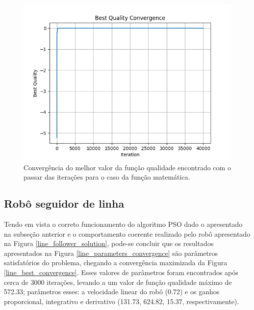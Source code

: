 \documentclass[conference]{IEEEtran}
\begin{document}
\begin{figure}[htbp]
\centering
\centerline{\includegraphics[scale=0.4]{test_best_convergence.png}}
\caption{Convergência do melhor valor da função qualidade encontrado com o passar das iterações para o caso da função matemática.}
\label{test_best_convergence}
\end{figure}

\subsection{Robô seguidor de linha}

Tendo em vista o correto funcionamento do algoritmo PSO dado o apresentado na subseção anterior e o comportamento coerente realizado pelo robô apresentado na Figura \ref{line_follower_solution}, pode-se concluir que os resultados apresentados na Figura \ref{line_parameters_convergence} são parâmetros satisfatórios do problema, chegando a convergência maximizada da Figura \ref{line_best_convergence}. Esses valores de parâmetros foram encontrados após cerca de 3000 iterações, levando a um valor de função qualidade máximo de 572.33; parâmetros esses: a velocidade linear do robô (0.72) e os ganhos proporcional, integrativo e derivativo (131.73, 624.82, 15.37, respectivamente).
\end{document}
